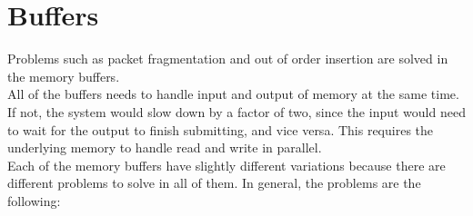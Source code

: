 \section{Buffers}
Problems such as packet fragmentation and out of order insertion are solved in
the memory buffers.\\
All of the buffers needs to handle input and output of
memory at the same time. If not, the system would slow down by a factor of two,
since the input would need to wait for the output to finish submitting, and
vice versa. This requires the underlying memory to handle read and write in
parallel. \\
Each of the memory buffers have slightly different variations because
there are different problems to solve in all of them. In general, the problems
are the following: 

